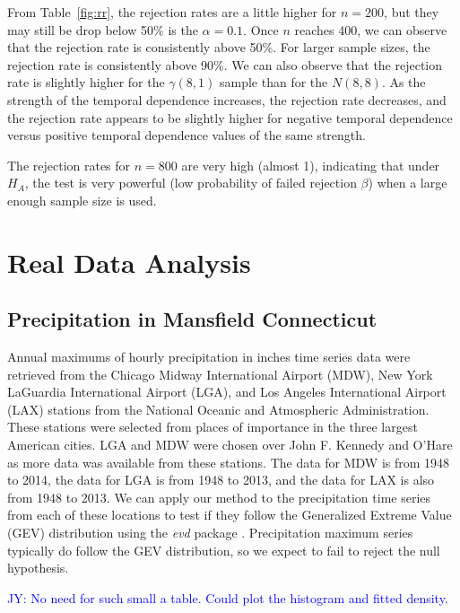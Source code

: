 \documentclass[12pt, titlepage, letterpaper]{article}
\newcommand{\jy}[1]{\textcolor{blue}{JY: #1}}
\newcommand{\mc}[1]{\textcolor{green}{MC: (#1)}}
\begin{document}
{From 
Table~\ref{fig:rr}, 
the rejection rates are a little higher for $n = 200$, but they may still be 
drop below 50\% is the $\alpha = 0.1$. Once $n$ reaches 400, we can observe 
that the rejection rate
is consistently above 50\%. For larger sample sizes, the rejection rate is 
consistently above 90\%. We can also
observe that the rejection rate is slightly higher for the $\gamma(8, 1)$ sample 
than for 
the $N(8, 8)$. As the strength of the temporal dependence increases, the 
rejection rate decreases, and the rejection
rate appears to be slightly higher for negative temporal dependence versus 
positive temporal dependence values of the same strength.


The rejection rates for $n = 800$
are very 
high (almost 1), indicating that under $H_A$, the test is very powerful 
(low probability of failed rejection $\beta$) when a large enough
sample size is used.


\section{Real Data Analysis}
\label{sec:real}

\subsection{Precipitation in Mansfield Connecticut}
\label{sec:precipitation}
Annual maximums of hourly precipitation in inches time series data were 
retrieved 
from the Chicago Midway International Airport (MDW), New York LaGuardia 
International 
Airport (LGA),
and Los Angeles International Airport (LAX) stations from the 
National Oceanic and Atmospheric Administration. These stations were selected 
from places of importance in the three largest American cities. LGA and
MDW were chosen over John F. Kennedy and O'Hare as more data was available
from these stations. The data for MDW is from
1948 to 2014, the data for LGA is from 1948 to 2013, and the
data for LAX is also from 1948 to 2013. We can apply our method to
the precipitation time series from each of these locations to test if they
follow the
Generalized Extreme Value (GEV) distribution using the \textsl{evd} 
package \citep{evd}. Precipitation maximum series 
typically do follow the GEV distribution, so we expect to fail to reject the
null hypothesis.

\jy{No need for such small a table. Could plot the histogram and fitted density.}



}
\end{document}
